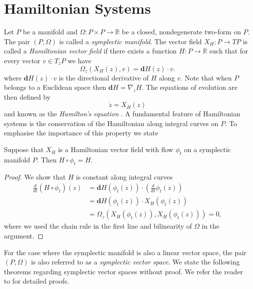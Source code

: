 \section{Hamiltonian Systems} \label{chap:Hasy:1}
Let $P$ be a manifold and $\Omega:P\times P \to \mathbb R$ be a closed, nondegenerate two-form on $P$. The pair $(P,\Omega)$ is called a \emph{symplectic manifold}. The vector field $X_H:P \to TP$ is called a \emph{Hamiltonian vector field} if there exists a function $H:P\to \mathbb R$ such that for every vector $v\in T_zP$ we have
\begin{equation} \label{eq:Hasy:1}
	\Omega_z(X_H(z),v) = \mathbf d H(z) \cdot v.
\end{equation}
where $\mathbf d H(z) \cdot v$ is the directional derivative of $H$ along $v$. Note that when $P$ belongs to a Euclidean space then $\mathbf d H = \nabla_z H$. The equations of evolution are then defined by
\begin{equation} \label{eq:Hasy:2}
	\dot z = X_H(z)
\end{equation}
and known as the \emph{Hamilton's equation} \cite{Marsden:1999ck}. A fundamental feature of Hamiltonian systems is the conservation of the Hamiltonian along integral curves on $P$. To emphasise the importance of this property we state

\begin{theorem} \label{theorem:Hasy:1}
Suppose that $X_H$ is a Hamiltonian vector field with flow $\phi_t$ on a symplectic manifold $P$. Then $H\circ \phi_t = H$.
\end{theorem}

\begin{proof}
We show that $H$ is constant along integral curves
\begin{equation} \label{eq:Hasy:3}
\begin{aligned}
	\frac{d}{dt}(H\circ \phi_t)(z) &= \mathbf d H(\phi_t(z)) \cdot( \frac{d}{dt} \phi_t(z) ) \\
	&= \mathbf d H (\phi_t(z))\cdot X_H(\phi_t(z)) \\
	&= \Omega_z( X_H(\phi_t(z)), X_H(\phi_t(z)) ) = 0,
\end{aligned}
\end{equation}
where we used the chain rule in the first line and bilinearity of $\Omega$ in the argument.
\end{proof}

For the case where the symplectic manifold is also a linear vector space, the pair $(P,\Omega)$ is also referred to as a \emph{symplectic vector space}. We state the following theorems regarding symplectic vector spaces without proof. We refer the reader to \cite{Marsden:1999ck,de2006symplectic,Silva01lectureson} for detailed proofs.

